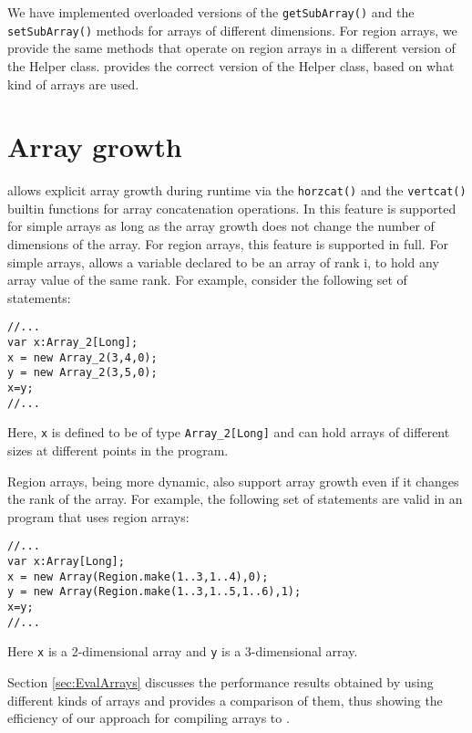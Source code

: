 We have implemented overloaded versions of the \texttt{getSubArray()} and the
\texttt{setSubArray()} methods for arrays of different dimensions. For region
arrays, we provide the same methods that operate on region arrays in a different
version of the Helper class.  \mixten provides the correct version of the Helper
class, based on what kind of arrays are used.


\section{Array growth} 

\matlab allows explicit array growth during runtime via the \texttt{horzcat()}
and the \texttt{vertcat()} builtin functions for array concatenation operations. 
In \mixten this feature is
supported for simple arrays as long as the array growth does not change the
number of dimensions of the array. For region arrays, this feature is supported
in full. For simple arrays, \xten allows a variable declared to be an array of
rank i, to hold any array value of the same rank. For example, consider the
following set of statements:
\begin{lstlisting}[language=x10,numbers=none]                                
//...
var x:Array_2[Long];
x = new Array_2(3,4,0);
y = new Array_2(3,5,0);
x=y;
//...
\end{lstlisting}
Here, \verb|x| is defined to be of type \texttt{Array\_2[Long]} and can hold
arrays of different sizes at different points in the program.

Region arrays, being more dynamic, also support array growth even if it changes
the rank of the array. For example, the following set of statements are valid in
an \xten program that uses region arrays:
\begin{lstlisting}[language=x10,numbers=none]                                
//...
var x:Array[Long];
x = new Array(Region.make(1..3,1..4),0);
y = new Array(Region.make(1..3,1..5,1..6),1);
x=y;
//...
\end{lstlisting}
Here \verb|x| is a 2-dimensional array and \verb|y| is a 3-dimensional array. 

\par
Section \ref{sec:EvalArrays} discusses the performance results obtained by
using
different kinds of arrays and provides a comparison of them, thus showing the
efficiency of our approach for compiling \matlab arrays to \xten.
